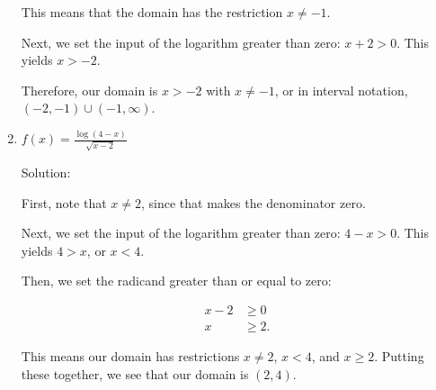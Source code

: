 \documentclass{ximera}
\begin{document}
\begin{enumerate}
\begin{expandable}
This means that the domain has the restriction $x \ne -1$. 

Next, we set the input of the logarithm greater than zero: $x + 2 > 0$. This yields $x > -2$.

Therefore, our domain is $x > -2$ with $x \ne -1$, or in interval notation, $(-2, -1) \cup (-1, \infty)$. 
		\end{expandable}
	\item $f(x) = \frac{\log(4 - x)}{\sqrt{x - 2}}$
		\begin{expandable}
			Solution:

First, note that $x \ne 2$, since that makes the denominator zero.

Next, we set the input of the logarithm greater than zero: $4 - x > 0$. This yields $4 > x$, or $x < 4$.

Then, we set the radicand greater than or equal to zero:

\begin{align*}x - 2&\ge 0 \\ x & \ge 2. \end{align*}

This means our domain has restrictions $x \ne 2$, $x < 4$, and $x \ge 2$. Putting these together, we see that our domain is $(2, 4)$. 
		\end{expandable}
\end{enumerate}



\end{document}
